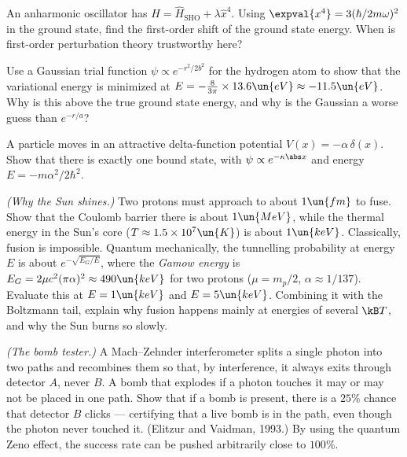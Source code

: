 \begin{problems}
 An anharmonic oscillator has $\hat H = \hat H_{\text{SHO}} + \lambda\hat x^4$. Using $\expval{x^4} = 3(\hbar/2m\omega)^2$ in the ground state, find the first-order shift of the ground state energy. When is first-order perturbation theory trustworthy here?

 Use a Gaussian trial function $\psi\propto e^{-r^2/2b^2}$ for the hydrogen atom to show that the variational energy is minimized at $E = -\tfrac{8}{3\pi}\times13.6\un{eV}\approx-11.5\un{eV}$. Why is this above the true ground state energy, and why is the Gaussian a worse guess than $e^{-r/a}$?

\core A particle moves in an attractive delta-function potential $V(x) = -\alpha\,\delta(x)$. Show that there is exactly one bound state, with $\psi\propto e^{-\kappa\abs x}$ and energy $E = -m\alpha^2/2\hbar^2$.

\core \label{prob:gamow} \emph{(Why the Sun shines.)} Two protons must approach to about $1\un{fm}$ to fuse. Show that the Coulomb barrier there is about $1\un{MeV}$, while the thermal energy in the Sun's core ($T\approx1.5\times10^7\un{K}$) is about $1\un{keV}$. Classically, fusion is impossible. Quantum mechanically, the tunnelling probability at energy $E$ is about $e^{-\sqrt{E_G/E}}$, where the \emph{Gamow energy} is $E_G = 2\mu c^2(\pi\alpha)^2\approx 490\un{keV}$ for two protons ($\mu = m_p/2$, $\alpha\approx1/137$). Evaluate this at $E = 1\un{keV}$ and $E=5\un{keV}$. Combining it with the Boltzmann tail, explain why fusion happens mainly at energies of several $\kB T$, and why the Sun burns so slowly.

 \emph{(The bomb tester.)} A Mach--Zehnder interferometer splits a single photon into two paths and recombines them so that, by interference, it always exits through detector $A$, never $B$. A bomb that explodes if a photon touches it may or may not be placed in one path. Show that if a bomb is present, there is a $25\%$ chance that detector $B$ clicks --- certifying that a live bomb is in the path, even though the photon never touched it. (Elitzur and Vaidman, 1993.) By using the quantum Zeno effect, the success rate can be pushed arbitrarily close to $100\%$.
\end{problems}

\begin{reading}
\end{reading}
